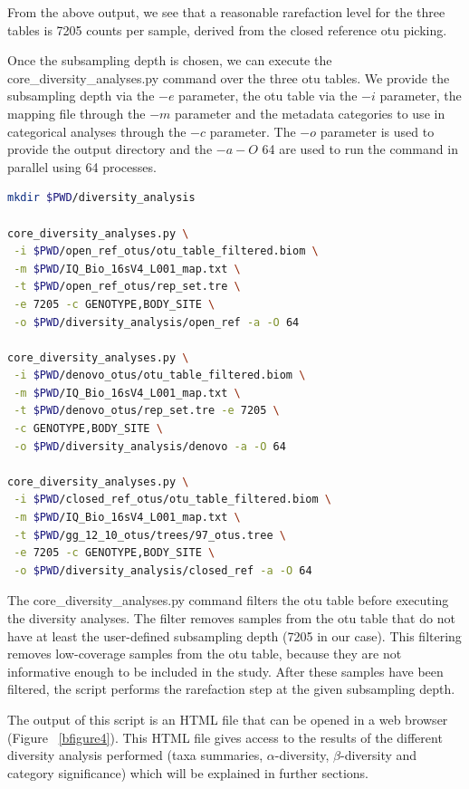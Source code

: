 From the above output, we see that a reasonable rarefaction level for the three
tables is 7205 counts per sample, derived from the closed reference \gls{otu} picking.

Once the subsampling depth is chosen, we can execute the core\_diversity\_analyses.py
command over the three \gls{otu} tables. We provide the subsampling depth via the
$-e$ parameter, the \gls{otu} table via the $-i$ parameter, the mapping file through
the $-m$ parameter and the metadata categories to use in categorical analyses through
the $-c$ parameter. The $-o$ parameter is used to provide the output directory and the
$-a -O$ 64 are used to run the command in parallel using 64 processes.

\begin{lstlisting}[language=bash]
mkdir $PWD/diversity_analysis

core_diversity_analyses.py \
 -i $PWD/open_ref_otus/otu_table_filtered.biom \
 -m $PWD/IQ_Bio_16sV4_L001_map.txt \
 -t $PWD/open_ref_otus/rep_set.tre \
 -e 7205 -c GENOTYPE,BODY_SITE \
 -o $PWD/diversity_analysis/open_ref -a -O 64

core_diversity_analyses.py \
 -i $PWD/denovo_otus/otu_table_filtered.biom \
 -m $PWD/IQ_Bio_16sV4_L001_map.txt \
 -t $PWD/denovo_otus/rep_set.tre -e 7205 \
 -c GENOTYPE,BODY_SITE \
 -o $PWD/diversity_analysis/denovo -a -O 64

core_diversity_analyses.py \
 -i $PWD/closed_ref_otus/otu_table_filtered.biom \
 -m $PWD/IQ_Bio_16sV4_L001_map.txt \
 -t $PWD/gg_12_10_otus/trees/97_otus.tree \
 -e 7205 -c GENOTYPE,BODY_SITE \
 -o $PWD/diversity_analysis/closed_ref -a -O 64
\end{lstlisting}

The core\_diversity\_analyses.py command filters the \gls{otu} table before
executing the diversity analyses. The filter removes samples from the \gls{otu}
table that do not have at least the user-defined subsampling depth (7205 in our
case). This filtering removes low-coverage samples from the \gls{otu} table, because
they are not informative enough to be included in the study. After these samples
have been filtered, the script performs the rarefaction step at the given subsampling depth.

The output of this script is an HTML file that can be opened in a web browser (Figure ~\ref{bfigure4}).
This HTML file gives access to the results of the different diversity analysis performed
(taxa summaries, $\alpha$-diversity, $\beta$-diversity and category significance)
which will be explained in further sections.

